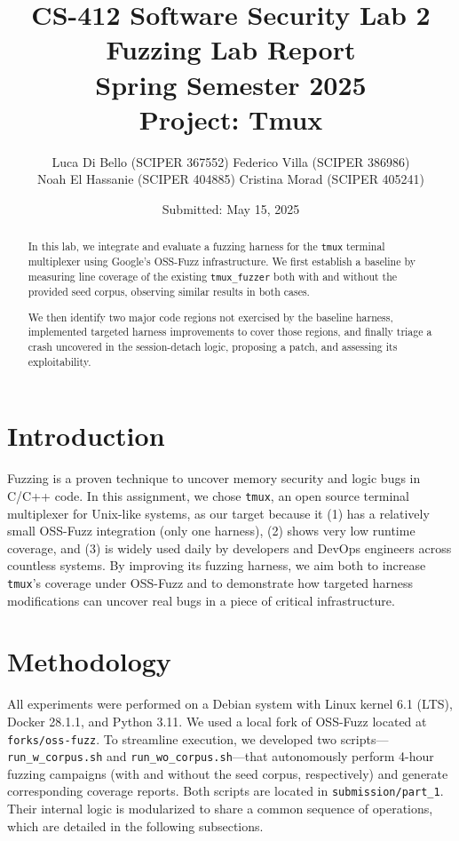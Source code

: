 \documentclass[11pt,a4paper,twocolumn]{article}
\title{%
  CS-412 Software Security Lab 2\\[0.5em]
  \Large Fuzzing Lab Report\\
  Spring Semester 2025\\[0.5em]
  Project: Tmux
}
\author{%
  Luca Di Bello (SCIPER 367552)
  Federico Villa (SCIPER 386986) \\
  Noah El Hassanie (SCIPER 404885)
  Cristina Morad (SCIPER 405241) \\
}
\date{Submitted: May 15, 2025}
\begin{document}
\maketitle

\begin{abstract}
	In this lab, we integrate and evaluate a fuzzing harness for the \texttt{tmux} terminal
	multiplexer using Google’s OSS-Fuzz infrastructure. We first establish a baseline
	by measuring line coverage of the existing \texttt{tmux\_fuzzer} both with and without the
	provided seed corpus, observing similar results in both cases.

	We then identify two major code regions not exercised by the baseline harness, implemented
targeted harness improvements to cover those regions, and finally triage a crash uncovered
in the session-detach logic, proposing a patch, and assessing its exploitability.
\end{abstract}

\section*{Introduction}
\label{sec:introduction}

Fuzzing is a proven technique to uncover memory security and logic bugs in
C/C++ code. In this assignment, we chose \texttt{tmux}, an open source terminal
multiplexer for Unix-like systems, as our target because it (1) has a relatively
small OSS-Fuzz integration (only one harness), (2) shows very low runtime
coverage, and (3) is widely used daily by developers and DevOps engineers across
countless systems. By improving its fuzzing harness, we aim both to increase
\texttt{tmux}'s coverage under OSS-Fuzz and to demonstrate how targeted harness
modifications can uncover real bugs in a piece of critical infrastructure.

\section*{Methodology}
\label{sec:methodology}

All experiments were performed on a Debian system with Linux kernel 6.1 (LTS),
Docker 28.1.1, and Python 3.11. We used a local fork of OSS-Fuzz located at
\texttt{forks/oss-fuzz}. To streamline execution, we developed two
scripts---\texttt{run\_w\_corpus.sh} and \texttt{run\_wo\_corpus.sh}---that
autonomously perform 4-hour fuzzing campaigns (with and without the seed corpus,
respectively) and generate corresponding coverage reports. Both scripts are
located in \texttt{submission/part\_1}. Their internal logic is modularized to
share a common sequence of operations, which are detailed in the following
subsections.
\end{document}
